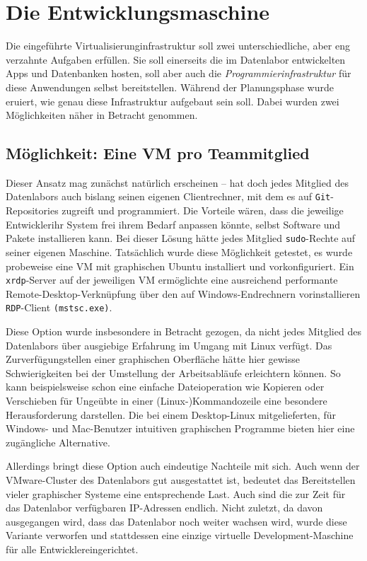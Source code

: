 
\newpage{}
\chapter{Die Entwicklungsmaschine}
Die eingeführte Virtualisierunginfrastruktur soll zwei unterschiedliche, aber eng verzahnte Aufgaben erfüllen.
Sie soll einerseits die im Datenlabor entwickelten Apps und Datenbanken hosten, soll aber auch die \textit{Programmierinfrastruktur} für diese Anwendungen selbst bereitstellen.
Während der Planungsphase wurde eruiert, wie genau diese Infrastruktur aufgebaut sein soll.
Dabei wurden zwei Möglichkeiten näher in Betracht genommen.

\section{Möglichkeit: Eine VM pro Teammitglied}
Dieser Ansatz mag zunächst natürlich erscheinen -- hat doch jedes Mitglied des Datenlabors auch bislang seinen eigenen Clientrechner, mit dem es auf \texttt{Git}-Repositories zugreift und programmiert.
Die Vorteile wären, dass die jeweilige Entwickler\ggin ihr System frei ihrem Bedarf anpassen könnte, selbst Software und Pakete installieren kann.
Bei dieser Lösung hätte jedes Mitglied \texttt{sudo}-Rechte auf seiner eigenen Maschine.
Tatsächlich wurde diese Möglichkeit getestet, es wurde probeweise eine VM mit graphischen Ubuntu installiert und vorkonfiguriert.
Ein \texttt{xrdp}-Server auf der jeweiligen VM ermöglichte eine ausreichend performante Remote-Desktop-Verknüpfung über den auf Windows-Endrechnern vorinstallieren \texttt{\acs{RDP}}-Client \texttt{(mstsc.exe)}.

Diese Option wurde insbesondere in Betracht gezogen, da nicht jedes Mitglied des Datenlabors über ausgiebige Erfahrung im Umgang mit Linux verfügt.
Das Zurverfügungstellen einer graphischen Oberfläche hätte hier gewisse Schwierigkeiten bei der Umstellung der Arbeitsabläufe erleichtern können.
So kann beispielsweise schon eine einfache Dateioperation wie Kopieren oder Verschieben für Ungeübte in einer (Linux-)Kommandozeile eine besondere Herausforderung darstellen. Die bei einem Desktop-Linux mitgelieferten, für Windows- und Mac-Benutzer intuitiven graphischen Programme bieten hier eine zugängliche Alternative.

Allerdings bringt diese Option auch eindeutige Nachteile mit sich.
Auch wenn der VMware-Cluster des Datenlabors gut ausgestattet ist, bedeutet das Bereitstellen vieler graphischer Systeme eine entsprechende Last.
Auch sind die zur Zeit für das Datenlabor verfügbaren IP-Adressen endlich.
Nicht zuletzt, da davon ausgegangen wird, dass das Datenlabor noch weiter wachsen wird, wurde diese Variante verworfen und stattdessen eine einzige virtuelle Development-Maschine für alle Entwickler\gginnen eingerichtet.


